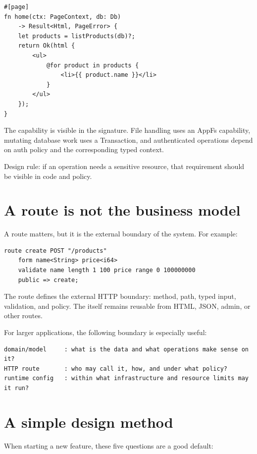 \begin{lstlisting}[language=Velran]
#[page]
fn home(ctx: PageContext, db: Db)
    -> Result<Html, PageError> {
    let products = listProducts(db)?;
    return Ok(html {
        <ul>
            @for product in products {
                <li>{{ product.name }}</li>
            }
        </ul>
    });
}
\end{lstlisting}

The  capability is visible in the signature. File handling uses an AppFs capability, mutating database work uses a Transaction, and authenticated operations depend on auth policy and the corresponding typed context.

Design rule: if an operation needs a sensitive resource, that requirement should be visible in code and policy.

\section{A route is not the business model}

A route matters, but it is the external boundary of the system. For example:

\begin{lstlisting}[language=Velran]
route create POST "/products"
    form name<String> price<i64>
    validate name length 1 100 price range 0 100000000
    public => create;
\end{lstlisting}

The route defines the external HTTP boundary: method, path, typed input, validation, and policy. The  itself remains reusable from HTML, JSON, admin, or other routes.

For larger applications, the following boundary is especially useful:

\begin{lstlisting}
domain/model     : what is the data and what operations make sense on it?
HTTP route       : who may call it, how, and under what policy?
runtime config   : within what infrastructure and resource limits may it run?
\end{lstlisting}

\section{A simple design method}

When starting a new feature, these five questions are a good default:


